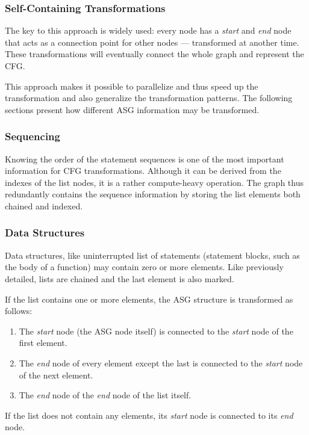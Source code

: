 \subsubsection{Self-Containing Transformations}
The key to this approach is widely used: every node has a \emph{start} and \emph{end} node that acts as a connection point for other nodes --- transformed at another time. These transformations will eventually connect the whole graph and represent the CFG.

This approach makes it possible to parallelize and thus speed up the transformation and also generalize the transformation patterns. The following sections present how different ASG information may be transformed.

\subsubsection{Sequencing}
Knowing the order of the statement sequences is one of the most important information for CFG transformations. Although it can be derived from the indexes of the list nodes, it is a rather compute-heavy operation. The graph thus redundantly contains the sequence information by storing the list elements both chained and indexed.

\subsubsection{Data Structures}
Data structures, like uninterrupted list of statements (statement blocks, such as the body of a function) may contain zero or more elements. Like previously detailed, lists are chained and the last element is also marked.

If the list contains one or more elements, the ASG structure is transformed as follows:
\begin{enumerate}[topsep=0pt]
	\item The \emph{start} node (the ASG node itself) is connected to the \emph{start} node of the first element.
	\item The \emph{end} node of every element except the last is connected to the \emph{start} node of the next element.
	\item The \emph{end} node of the \emph{end} node of the list itself.
\end{enumerate}


If the list does not contain any elements, its \emph{start} node is connected to its \emph{end} node.


